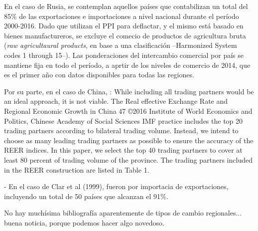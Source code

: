 En el caso de Rusia, se contemplan aquellos países que contabilizan un total del 85\% de las exportaciones e importaciones a nivel nacional durante el período 2000-2016. Dado que utilizan el PPI para deflactar, y el mismo está basado en bienes manufactureros, se excluye el comecio de productos de agricultura bruta (\textit{raw agricultaural products}, en base a una clasificación –Harmonized System codes 1 through 15–). Las ponderaciones del intercambio comercial por país se mantiene fija en todo el período, a aprtir de los niveles de comercio de 2014, que es el primer año con datos disponibles para todas las regiones.

Por su parte, en el caso de China, : While including all trading partners would be an ideal approach, it is not viable. The
Real effective Exchange Rate and Regional Economic Growth in China 47 ©2016 Institute of World Economics and Politics, Chinese Academy of Social Sciences IMF practice includes the top 20 trading partners according to bilateral trading volume.
Instead, we intend to choose as many leading trading partners as possible to ensure the accuracy of the REER indices. In this paper, we select the top 40 trading partners to cover at least 80 percent of trading volume of the province. The trading partners included in the REER construction are listed in Table 1.

- En el caso de Clar et al (1999), fueron por importacia de exportaciones, incluyendo un total de 50 países que alcanzan el 91\%.

No hay muchísima bibliografía aparentemente de tipos de cambio regionales... buena noticia, porque podemos hacer algo novedoso.


